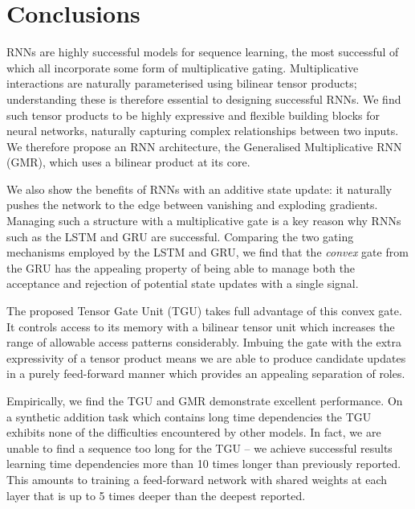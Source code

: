\chapter{Conclusions}\label{C:con}
RNNs are highly successful models for sequence learning, 
the most successful of which all incorporate some form of multiplicative
gating. Multiplicative interactions are naturally parameterised using bilinear tensor
products; understanding these is therefore essential to designing
successful RNNs.
We find such tensor products to be highly expressive and flexible building blocks for
neural networks, naturally capturing complex relationships between two inputs. We
therefore propose an RNN architecture, the Generalised Multiplicative RNN (GMR), which
uses a bilinear product at its core.

We also show the benefits of RNNs with an additive state update:
it naturally pushes the network to the edge between vanishing and exploding gradients.
Managing such a structure with a multiplicative gate is a key reason why RNNs such as
the LSTM and GRU are successful. Comparing the two gating mechanisms employed by the
LSTM and GRU, we find that the \emph{convex} gate from the GRU has the appealing property
of being able to manage both the acceptance and rejection of potential state updates with
a single signal.

The proposed Tensor Gate Unit (TGU) takes full advantage of this convex gate.
It controls access to its memory with a bilinear tensor unit which increases the range
of allowable access patterns considerably. 
Imbuing the gate with the extra expressivity of a tensor product means
we are able to produce candidate updates in a purely feed-forward manner which provides
an appealing separation of roles.

Empirically, we find the TGU and GMR demonstrate excellent performance. On a synthetic addition
task which contains long time dependencies the TGU exhibits none of the difficulties encountered
by other models.
In fact, we are unable to find a sequence too long for the TGU --
we achieve successful results learning time dependencies more than 10 times longer than previously reported.
This amounts to training a feed-forward network with shared weights
at each layer that is up to 5 times deeper than the deepest reported.


